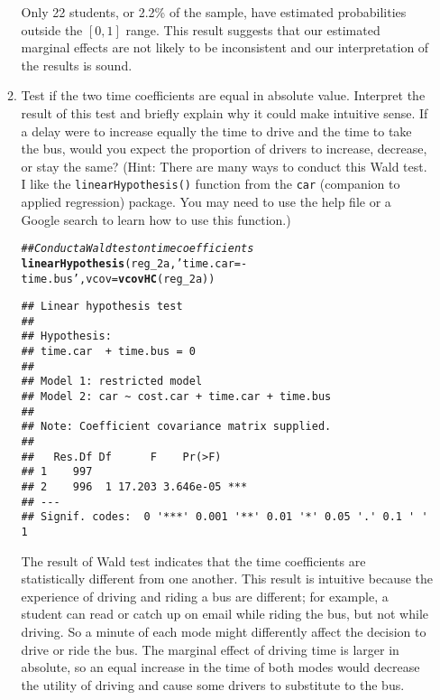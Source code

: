 \documentclass[11pt,letterpaper]{article}\usepackage[]{graphicx}\usepackage[]{xcolor}
\makeatletter
\newcommand{\hlstr}[1]{\textcolor[rgb]{0.192,0.494,0.8}{#1}}%
\newcommand{\hlcom}[1]{\textcolor[rgb]{0.678,0.584,0.686}{\textit{#1}}}%
\newcommand{\hlstd}[1]{\textcolor[rgb]{0.345,0.345,0.345}{#1}}%
\newcommand{\hlkwc}[1]{\textcolor[rgb]{0.333,0.667,0.333}{#1}}%
\newcommand{\hlkwd}[1]{\textcolor[rgb]{0.737,0.353,0.396}{\textbf{#1}}}%
\newenvironment{kframe}{%
 \def\at@end@of@kframe{}%
 \ifinner\ifhmode%
  \def\at@end@of@kframe{\end{minipage}}%
  \begin{minipage}{\columnwidth}%
 \fi\fi%
 \def\FrameCommand##1{\hskip\@totalleftmargin \hskip-\fboxsep
 \colorbox{shadecolor}{##1}\hskip-\fboxsep
     \hskip-\linewidth \hskip-\@totalleftmargin \hskip\columnwidth}%
 \MakeFramed {\advance\hsize-\width
   \@totalleftmargin\z@ \linewidth\hsize
   \@setminipage}}%
 {\par\unskip\endMakeFramed%
 \at@end@of@kframe}
\newenvironment{knitrout}{}{} %
\makeatother
\begin{document}
\begin{enumerate}[label=\alph*., leftmargin=*]
\begin{enumerate}[label=\roman*.]
		Only 22 students, or 2.2\% of the sample, have estimated probabilities outside the $[0, 1]$ range. This result suggests that our estimated marginal effects are not likely to be inconsistent and our interpretation of the results is sound.

		\item Test if the two time coefficients are equal in absolute value. Interpret the result of this test and briefly explain why it could make intuitive sense. If a delay were to increase equally the time to drive and the time to take the bus, would you expect the proportion of drivers to increase, decrease, or stay the same? (Hint: There are many ways to conduct this Wald test. I like the \texttt{linearHypothesis()} function from the \texttt{car} (companion to applied regression) package. You may need to use the help file or a Google search to learn how to use this function.) 

\begin{knitrout}
\color{fgcolor}\begin{kframe}
\begin{alltt}
\hlcom{## Conduct a Wald test on time coefficients}
\hlkwd{linearHypothesis}\hlstd{(reg_2a,} \hlstr{'time.car = -time.bus'}\hlstd{,} \hlkwc{vcov} \hlstd{=} \hlkwd{vcovHC}\hlstd{(reg_2a))}
\end{alltt}
\begin{verbatim}
## Linear hypothesis test
## 
## Hypothesis:
## time.car  + time.bus = 0
## 
## Model 1: restricted model
## Model 2: car ~ cost.car + time.car + time.bus
## 
## Note: Coefficient covariance matrix supplied.
## 
##   Res.Df Df      F    Pr(>F)    
## 1    997                        
## 2    996  1 17.203 3.646e-05 ***
## ---
## Signif. codes:  0 '***' 0.001 '**' 0.01 '*' 0.05 '.' 0.1 ' ' 1
\end{verbatim}
\end{kframe}
\end{knitrout}

		The result of Wald test indicates that the time coefficients are statistically different from one another. This result is intuitive because the experience of driving and riding a bus are different; for example, a student can read or catch up on email while riding the bus, but not while driving. So a minute of each mode might differently affect the decision to drive or ride the bus. The marginal effect of driving time is larger in absolute, so an equal increase in the time of both modes would decrease the utility of driving and cause some drivers to substitute to the bus.
	\end{enumerate}
\end{enumerate}
\end{document}
